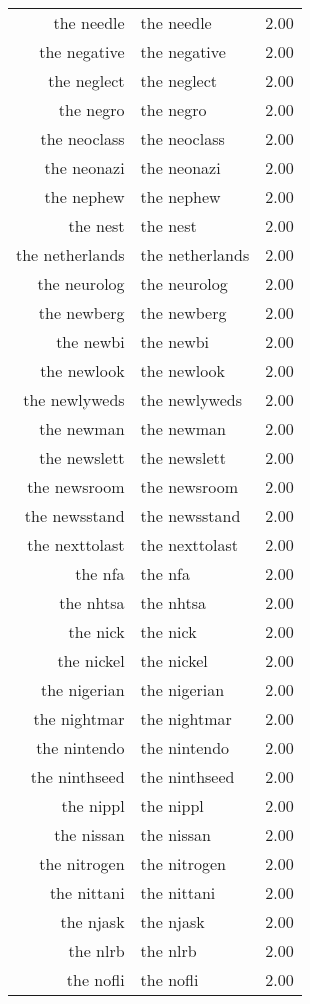 \begin{table}[ht]
\begin{tabular}{rlr}
  the needle & the needle & 2.00 \\ 
  the negative & the negative & 2.00 \\ 
  the neglect & the neglect & 2.00 \\ 
  the negro & the negro & 2.00 \\ 
  the neoclass & the neoclass & 2.00 \\ 
  the neonazi & the neonazi & 2.00 \\ 
  the nephew & the nephew & 2.00 \\ 
  the nest & the nest & 2.00 \\ 
  the netherlands & the netherlands & 2.00 \\ 
  the neurolog & the neurolog & 2.00 \\ 
  the newberg & the newberg & 2.00 \\ 
  the newbi & the newbi & 2.00 \\ 
  the newlook & the newlook & 2.00 \\ 
  the newlyweds & the newlyweds & 2.00 \\ 
  the newman & the newman & 2.00 \\ 
  the newslett & the newslett & 2.00 \\ 
  the newsroom & the newsroom & 2.00 \\ 
  the newsstand & the newsstand & 2.00 \\ 
  the nexttolast & the nexttolast & 2.00 \\ 
  the nfa & the nfa & 2.00 \\ 
  the nhtsa & the nhtsa & 2.00 \\ 
  the nick & the nick & 2.00 \\ 
  the nickel & the nickel & 2.00 \\ 
  the nigerian & the nigerian & 2.00 \\ 
  the nightmar & the nightmar & 2.00 \\ 
  the nintendo & the nintendo & 2.00 \\ 
  the ninthseed & the ninthseed & 2.00 \\ 
  the nippl & the nippl & 2.00 \\ 
  the nissan & the nissan & 2.00 \\ 
  the nitrogen & the nitrogen & 2.00 \\ 
  the nittani & the nittani & 2.00 \\ 
  the njask & the njask & 2.00 \\ 
  the nlrb & the nlrb & 2.00 \\ 
  the nofli & the nofli & 2.00 \\ 

\end{tabular}
\end{table}
